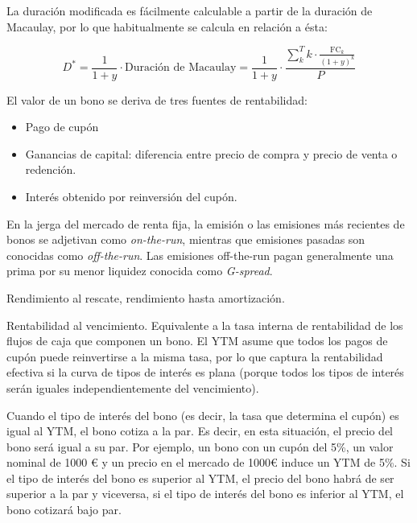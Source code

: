 \documentclass{nuevotema}
\begin{document}
La duración modificada es fácilmente calculable a partir de la duración de Macaulay, por lo que habitualmente se calcula en relación a ésta:

\begin{equation}
D^* = \frac{1}{1+y} \cdot \text{Duración de Macaulay} = \frac{1}{1+y} \cdot \frac{\sum_k^T k \cdot \frac{ \text{FC}_k}{(1+y)^k}}{P}
\end{equation}



El valor de un bono se deriva de tres fuentes de rentabilidad:
\begin{itemize}
	\item Pago de cupón
	\item Ganancias de capital: diferencia entre precio de compra y precio de venta o redención.
	\item Interés obtenido por reinversión del cupón.
\end{itemize}


En la jerga del mercado de renta fija, la emisión o las emisiones más recientes de bonos se adjetivan como \textit{on-the-run}, mientras que emisiones pasadas son conocidas como \textit{off-the-run}. Las emisiones off-the-run pagan generalmente una prima por su menor liquidez conocida como \textit{G-spread}.

Rendimiento al rescate, rendimiento hasta amortización.

Rentabilidad al vencimiento. Equivalente a la tasa interna de rentabilidad de los flujos de caja que componen un bono. El YTM asume que todos los pagos de cupón puede reinvertirse a la misma tasa, por lo que captura la rentabilidad efectiva si la curva de tipos de interés es plana (porque todos los tipos de interés serán iguales independientemente del vencimiento). 

Cuando el tipo de interés del bono (es decir, la tasa que determina el cupón) es igual al YTM, el bono cotiza a la par. Es decir, en esta situación, el precio del bono será igual a su par. Por ejemplo, un bono con un cupón del 5\%, un valor nominal de 1000 € y un precio en el mercado de 1000€ induce un YTM de 5\%. Si el tipo de interés del bono es superior al YTM, el precio del bono habrá de ser superior a la par y viceversa, si el tipo de interés del bono es inferior al YTM, el bono cotizará bajo par.
\end{document}
